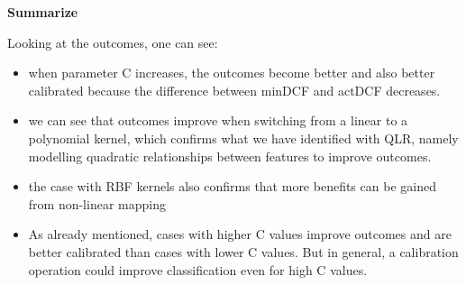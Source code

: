 \bigskip
\textbf{Summarize}\par
Looking at the outcomes, one can see:
\begin{itemize}
    \item when parameter C increases, the outcomes become better and also better calibrated because the difference between minDCF and actDCF decreases.
    \item we can see that outcomes improve when switching from a linear to a polynomial kernel, which confirms what we have identified with QLR,
    namely modelling quadratic relationships between features to improve outcomes.
    \item the case with RBF kernels also confirms that more benefits can be gained from non-linear mapping
    \item As already mentioned, cases with higher C values improve outcomes and are better calibrated than cases with lower C values.
    But in general, a calibration operation could improve classification even for high C values.
\end{itemize}

